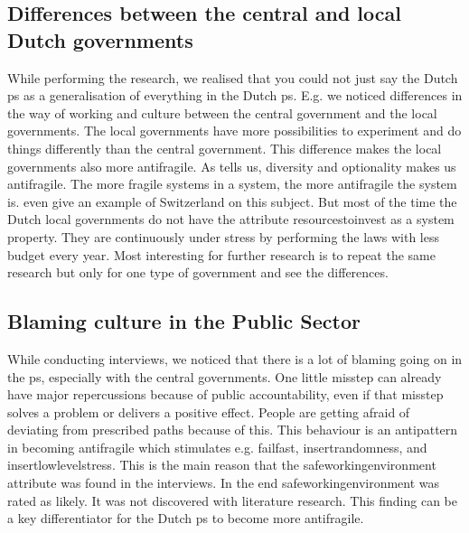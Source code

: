 \subsection{Differences between the central and local Dutch governments}
\label{sub:differenceslocalvscentral}
While performing the research, we realised that you could not just say the Dutch \gls{ps} as a generalisation of everything in the Dutch \gls{ps}. E.g. we noticed differences in the way of working and culture between the central government and the local governments. The local governments have more possibilities to experiment and do things differently than the central government. This difference makes the local governments also more \gls{antifragile}. As \textcite{Taleb2012} tells us, \gls{diversity} and \gls{optionality} makes us \gls{antifragile}. The more \gls{fragile} systems in a system, the more \gls{antifragile} the system is. \textcite[pp.~87--90]{Taleb2012} even give an example of Switzerland on this subject. But most of the time the Dutch local governments do not have the \gls{attribute} \gls{resourcestoinvest} as a system property. They are continuously under stress by performing the laws with less budget every year. Most interesting for further research is to repeat the same research but only for one type of government and see the differences.

\subsection{Blaming culture in the Public Sector}
\label{sub:blamingculture}
While conducting interviews, we noticed that there is a lot of blaming going on in the \gls{ps}, especially with the central governments. One little misstep can already have major repercussions because of public accountability, even if that misstep solves a problem or delivers a positive effect. People are getting afraid of deviating from prescribed paths because of this. This behaviour is an antipattern in becoming \gls{antifragile} which stimulates e.g. \gls{failfast}, \gls{insertrandomness}, and \gls{insertlowlevelstress}. This is the main reason that the \gls{safeworkingenvironment} \gls{attribute} was found in the interviews. In the end \gls{safeworkingenvironment} was rated as likely. It was not discovered with literature research. This finding can be a key differentiator for the Dutch \gls{ps} to become more \gls{antifragile}.

